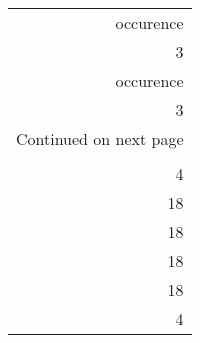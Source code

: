 \begin{longtable}{r}
\toprule
 occurence \\
         3 \\
\midrule
\endfirsthead

\toprule
 occurence \\
         3 \\
\midrule
\endhead
\midrule
\multicolumn{1}{r}{{Continued on next page}} \\
\midrule
\endfoot

\bottomrule
\endlastfoot
        13 \\
         4 \\
        18 \\
        18 \\
        18 \\
        18 \\
         4 \\
\end{longtable}
